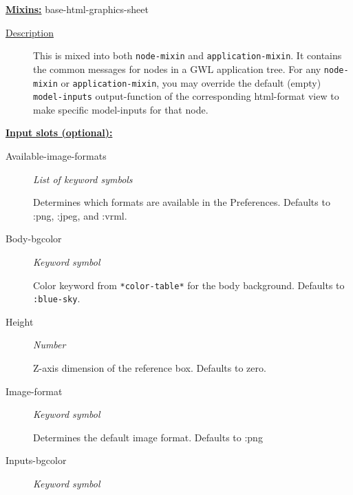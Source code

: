 \documentclass [11pt]{book}
\begin{document}
\begin{itemize}
\textbf{
\underline{Mixins:}} base-html-graphics-sheet





\begin{description}

\item [
\underline{Description}]


This is mixed into both \texttt{node-mixin} and \texttt{application-mixin}. It contains the common
messages for nodes in a GWL application tree. For any \texttt{node-mixin} or \texttt{application-mixin}, you may override the default (empty)
\texttt{model-inputs} output-function of the corresponding html-format view to make specific model-inputs for that node.



\end{description}








\textbf{
\underline{Input slots (optional):}}

\begin{description}

\item [Available-image-formats]
\emph{List of keyword symbols}

 Determines which formats are available in the Preferences. Defaults to :png, :jpeg, and :vrml.




\item [Body-bgcolor]
\emph{Keyword symbol}

 Color keyword from \texttt{*color-table*} for the body background. Defaults to \texttt{:blue-sky}.




\item [Height]
\emph{Number}

 Z-axis dimension of the reference box. Defaults to zero.




\item [Image-format]
\emph{Keyword symbol}

 Determines the default image format. Defaults to :png




\item [Inputs-bgcolor]
\emph{Keyword symbol}


\end{description}
\end{itemize}
\end{document}
